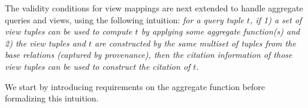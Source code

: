 







The validity conditions for view mappings are next extended to handle aggregate queries and views, using the following intuition: {\em for a query tuple $t$, if 1) a set of view tuples can be used to compute $t$ by applying some aggregate function(s) and 2) the view tuples and $t$ are constructed by the same multiset of tuples from the base relations (captured by provenance), then the citation information of those view tuples can be used to construct the citation of $t$}.


We start by introducing requirements on the %
aggregate function before formalizing this intuition.

